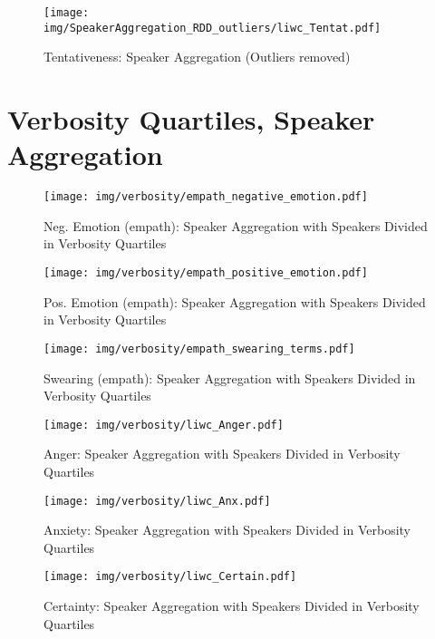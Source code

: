 \begin{figure}[h]\centering
\texttt{[image: img/SpeakerAggregation\_RDD\_outliers/liwc\_Tentat.pdf]}
\caption{Tentativeness: Speaker Aggregation (Outliers removed)}
\label{fig: sa_Tentativeness}
\end{figure}

\clearpage
\pagebreak

\section{Verbosity Quartiles, Speaker Aggregation}

\begin{figure}[h]\centering
\texttt{[image: img/verbosity/empath\_negative\_emotion.pdf]}
\caption{Neg. Emotion (empath): Speaker Aggregation with Speakers Divided in Verbosity Quartiles}
\label{fig: verbosity_Neg. Emotion (empath)}
\end{figure}

\begin{figure}[h]\centering
\texttt{[image: img/verbosity/empath\_positive\_emotion.pdf]}
\caption{Pos. Emotion (empath): Speaker Aggregation with Speakers Divided in Verbosity Quartiles}
\label{fig: verbosity_Pos. Emotion (empath)}
\end{figure}

\begin{figure}[h]\centering
\texttt{[image: img/verbosity/empath\_swearing\_terms.pdf]}
\caption{Swearing (empath): Speaker Aggregation with Speakers Divided in Verbosity Quartiles}
\label{fig: verbosity_Swearing (empath)}
\end{figure}

\begin{figure}[h]\centering
\texttt{[image: img/verbosity/liwc\_Anger.pdf]}
\caption{Anger: Speaker Aggregation with Speakers Divided in Verbosity Quartiles}
\label{fig: verbosity_Anger}
\end{figure}

\begin{figure}[h]\centering
\texttt{[image: img/verbosity/liwc\_Anx.pdf]}
\caption{Anxiety: Speaker Aggregation with Speakers Divided in Verbosity Quartiles}
\label{fig: verbosity_Anxiety}
\end{figure}

\begin{figure}[h]\centering
\texttt{[image: img/verbosity/liwc\_Certain.pdf]}
\caption{Certainty: Speaker Aggregation with Speakers Divided in Verbosity Quartiles}
\label{fig: verbosity_Certainty}
\end{figure}

